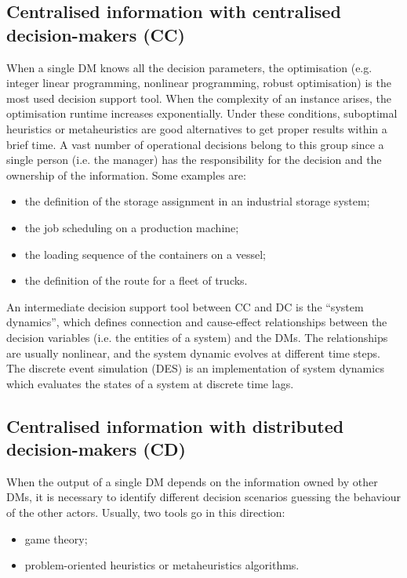 \subsection{Centralised information with centralised decision-makers (CC)}
When a single DM knows all the decision parameters, the optimisation (e.g. integer linear programming, nonlinear programming, robust optimisation) is the most used decision support tool. When the complexity of an instance arises, the optimisation runtime increases exponentially. Under these conditions, suboptimal heuristics or metaheuristics are good alternatives to get proper results within a brief time. A vast number of operational decisions belong to this group since a single person (i.e. the manager) has the responsibility for the decision and the ownership of the information. Some examples are:

\begin{itemize}
    \item the definition of the storage assignment in an industrial storage system;
    \item the job scheduling on a production machine;
    \item the loading sequence of the containers on a vessel;
    \item the definition of the route for a fleet of trucks.

\end{itemize}

An intermediate decision support tool between CC and DC is the “system dynamics”, which defines connection and cause-effect relationships between the decision variables (i.e. the entities of a system) and the DMs. The relationships are usually nonlinear, and the system dynamic evolves at different time steps. The discrete event simulation (DES) is an implementation of system dynamics which evaluates the states of a system at discrete time lags.

\subsection{Centralised information with distributed decision-makers (CD)}
When the output of a single DM depends on the information owned by other DMs, it is necessary to identify different decision scenarios guessing the behaviour of the other actors. Usually, two tools go in this direction:

\begin{itemize}
    \item game theory;
    \item problem-oriented heuristics or metaheuristics algorithms.
\end{itemize}

